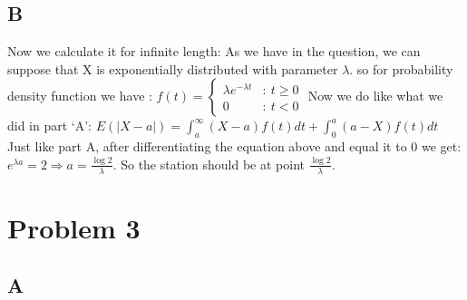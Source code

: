 \documentclass[12pt]{article}
\begin{document}
\subsection*{B}
Now we calculate it for infinite length: \newline As we have in the question,
we can suppose that X is exponentially distributed with parameter $\lambda$. so
for probability density function we have : \newline \newline $f(t) = \left\{ \begin{array}{cl}
        \lambda e^{-\lambda t} & : \ t \geq 0 \\
        0                      & : \ t < 0
    \end{array} \right.$
\newline \newline Now we do like what we did in part `A':
\newline  \newline $E(|X-a|)=\int_{a}^{\infty } (X-a)f(t)dt +\int_{0}^{a} (a-X)f(t)dt$
\newline \newline Just like part A, after differentiating the equation above and equal it to $0$ we get:\newline \newline
$e^{\lambda a} = 2 \Rightarrow a=\frac{\log 2}{\lambda}$.
\newline \newline So the station should be at point $\frac{\log 2}{\lambda}$.\newline \newline
\section*{Problem 3}
\subsection*{A}
\end{document}

